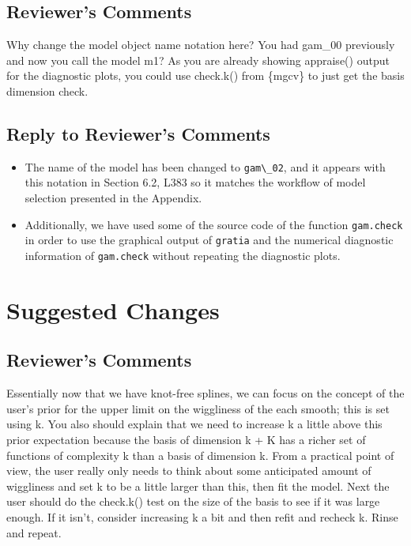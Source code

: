 \documentclass[
]{article}
\newcommand{\passthrough}[1]{#1}
\providecommand{\tightlist}{%
  \setlength{\itemsep}{0pt}\setlength{\parskip}{0pt}}
\begin{document}
\hypertarget{reviewers-comments-10}{%
\subsection{Reviewer's Comments}\label{reviewers-comments-10}}

Why change the model object name notation here? You had gam\_00 previously and now you call the model m1? As you are already showing appraise() output for the diagnostic plots, you could use check.k() from \{mgcv\} to just get the basis dimension check.

\hypertarget{section-11}{%
\subsection{\texorpdfstring{\textcolor{reviewersblue} {Reply to Reviewer's Comments}}{}}\label{section-11}}

\begin{itemize}
\tightlist
\item
  The name of the model has been changed to \passthrough{\lstinline!gam\_02!}, and it appears with this notation in Section 6.2, L383 so it matches the workflow of model selection presented in the Appendix.
\item
  Additionally, we have used some of the source code of the function \passthrough{\lstinline!gam.check!} in order to use the graphical output of \passthrough{\lstinline!gratia!} and the numerical diagnostic information of \passthrough{\lstinline!gam.check!} without repeating the diagnostic plots.
\end{itemize}

\hypertarget{suggested-changes}{%
\section{Suggested Changes}\label{suggested-changes}}

\hypertarget{reviewers-comments-11}{%
\subsection{Reviewer's Comments}\label{reviewers-comments-11}}

Essentially now that we have knot-free splines, we can focus on the concept of the user's prior for the upper limit on the wiggliness of the each smooth; this is set using k. You also should explain that we need to increase k a little above this prior expectation because the basis of dimension k + K has a richer set of functions of complexity k than a basis of dimension k. From a practical point of view, the user really only needs to think about some anticipated amount of wiggliness and set k to be a little larger than this, then fit the model.
Next the user should do the check.k() test on the size of the basis to see if it was large enough. If it isn't, consider increasing k a bit and then refit and recheck k. Rinse and repeat.
\end{document}
